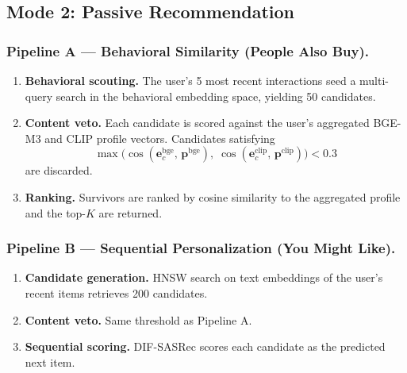 
\subsection{Mode 2: Passive Recommendation}
\label{ssec:passive}

\subsubsection{Pipeline A — Behavioral Similarity (People Also Buy).}
\label{sssec:pipelineA}

\begin{enumerate}
  \item \textbf{Behavioral scouting.} The user's 5 most recent interactions
        seed a multi-query search in the behavioral embedding space, yielding 50 candidates.
  \item \textbf{Content veto.} Each candidate is scored against the user's
        aggregated BGE-M3 and CLIP profile vectors.
        Candidates satisfying
        \begin{equation*}
          \max\!\bigl(
            \cos(\mathbf{e}^{\text{bge}}_c,\,\mathbf{p}^{\text{bge}}),\;
            \cos(\mathbf{e}^{\text{clip}}_c,\,\mathbf{p}^{\text{clip}})
          \bigr) < 0.3
        \end{equation*}
        are discarded.
  \item \textbf{Ranking.} Survivors are ranked by cosine similarity to the
        aggregated profile and the top-$K$ are returned.
\end{enumerate}

\subsubsection{Pipeline B — Sequential Personalization (You Might Like).}
\label{sssec:pipelineB}

\begin{enumerate}
  \item \textbf{Candidate generation.} HNSW search on text embeddings of
        the user's recent items retrieves 200 candidates.
  \item \textbf{Content veto.} Same threshold as Pipeline A.
  \item \textbf{Sequential scoring.} DIF-SASRec scores each candidate as the
        predicted next item.
\end{enumerate}


